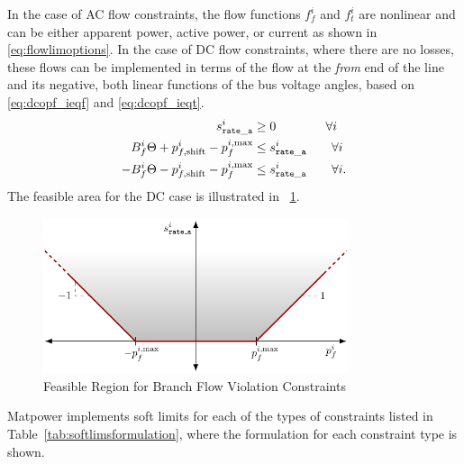 \documentclass[12pt]{article}
\newcommand{\matpower}[0]{{\sc Matpower}}
\numberwithin{equation}{section}
\numberwithin{table}{section}
\numberwithin{figure}{section}
\begin{document}
In the case of AC flow constraints, the flow functions $f_f^i$ and $f_t^i$ are nonlinear and can be either apparent power, active power, or current as shown in \eqref{eq:flowlimoptions}. In the case of DC flow constraints, where there are no losses, these flows can be implemented in terms of the flow at the \emph{from} end of the line and its negative, both linear functions of the bus voltage angles, based on \eqref{eq:dcopf_ieqf} and \eqref{eq:dcopf_ieqt}.
\begin{align}
s_{\tt{rate\_a}}^i &\ge 0 \qquad\qquad \forall{i}\\
B_f^i \Theta + p_{f,\mathrm{shift}}^i -  p_f^{i,\mathrm{max}} &\le s_{\tt{rate\_a}}^i \qquad \forall{i}  \\
-B_f^i \Theta - p_{f,\mathrm{shift}}^i -  p_f^{i,\mathrm{max}} &\le s_{\tt{rate\_a}}^i \qquad \forall{i}. \label{eq:softlimconstraint}
\end{align}
The feasible area for the DC case is illustrated in \figurename~\ref{fig:softlims}.

\begin{figure}[!th]
  \centering
  \includegraphics[width=0.8\textwidth]{./figures/softlims}
  \caption{Feasible Region for Branch Flow Violation Constraints}
  \label{fig:softlims}
\end{figure}

\matpower{} implements soft limits for each of the types of constraints listed in Table~\ref{tab:softlimsformulation}, where the formulation for each constraint type is shown.
\end{document}

